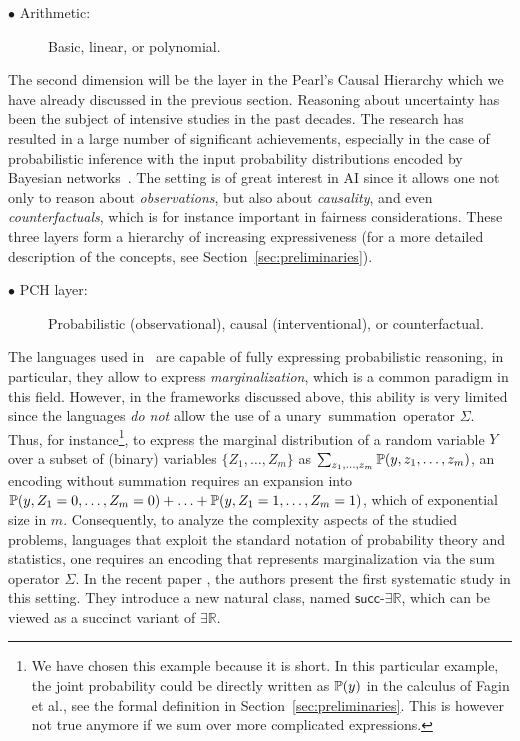 \documentclass[a4paper,UKenglish,cleveref, autoref, thm-restate]{lipics-v2021}
\newcommand{\IR}{\mathbb{R}}
\newcommand{\compactEquals}[1]{\let\IsInPP=1#1\let\IsInPP=\relax}
\newcommand{\PP}[1]{\mathbb{P}(\compactEquals{#1})}
\newcommand{\existsR}{\ensuremath{\mathsf{\exists\IR}}}
\newcommand{\succR}{\ensuremath{\mathsf{succ\text{-}\exists\IR}}}
\begin{document}
\begin{description}
    \item[$\bullet$ Arithmetic:] Basic, linear, or polynomial. 
\end{description}

The second dimension will be the layer in the Pearl’s Causal Hierarchy which we have already discussed in the previous section. Reasoning about uncertainty has been the subject of intensive studies in the past decades. The research has resulted  in a large number of significant achievements, especially in the case of probabilistic inference with the input probability distributions encoded by Bayesian 
networks~\cite{pearl1988probabilistic}. The setting is of great interest in AI since it allows one not only to reason about \emph{observations}, but also about \emph{causality},  and even \emph{counterfactuals}, which is for instance important in fairness considerations. These three layers form a hierarchy of increasing expressiveness (for a more detailed description of the concepts, see Section~\ref{sec:preliminaries}).






\begin{description}
    \item[$\bullet$ PCH layer:] Probabilistic (observational), causal (interventional), or counterfactual.
\end{description}


The languages used in~\cite{fagin1990logic,ibeling2022mosse} are capable of fully expressing probabilistic reasoning, in particular, they allow to express \emph{marginalization}, which is a common paradigm in this field. However, in the frameworks discussed above, this ability is very
limited since the languages \emph{do not} allow the use of a unary~summation~operator $\Sigma$. Thus, for instance\footnote{
We have chosen this example because it is short. In this particular example, the joint probability could be directly written as $\PP{y}$ in the calculus of Fagin et al., see the formal definition in Section~\ref{sec:preliminaries}. This is however not true anymore if we sum over more complicated expressions.}, to express the marginal distribution of a random variable $Y$ over a subset of (binary) variables $\{Z_1,\ldots,Z_m\}$ as $\sum_{z_1,\ldots,z_m} \PP{y,z_1,\ldots,z_m}$, an encoding without summation requires an expansion into $\PP{y,Z_1=0,\ldots,Z_m=0} + \ldots +\PP{y,Z_1=1,\ldots,Z_m=1}$, which of exponential size in $m$. Consequently, to analyze the complexity aspects of the studied problems, languages that exploit the standard notation of probability theory and statistics, one requires an encoding that represents marginalization via the sum operator $\Sigma$. In the recent paper \cite{zander2023ijcai}, the authors present the first systematic study in this setting. They introduce a new natural class, named $\succR$, which can be viewed as a succinct variant of $\existsR$. 
\end{document}
